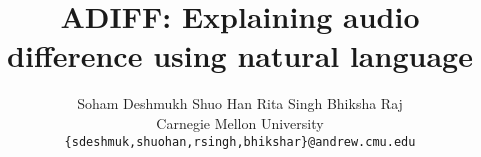 \documentclass{article} %
\title{ADIFF: Explaining audio difference using natural language}
\author{Soham Deshmukh \quad Shuo Han \quad Rita Singh \quad Bhiksha Raj \\
Carnegie Mellon University\\
\texttt{\{sdeshmuk,shuohan,rsingh,bhikshar\}@andrew.cmu.edu}
}
\begin{document}
\nocite{deshmukh2024domain,hira,heller2023,zhou2021narle} %

\maketitle








\newpage


\newpage
\appendix

\end{document}
